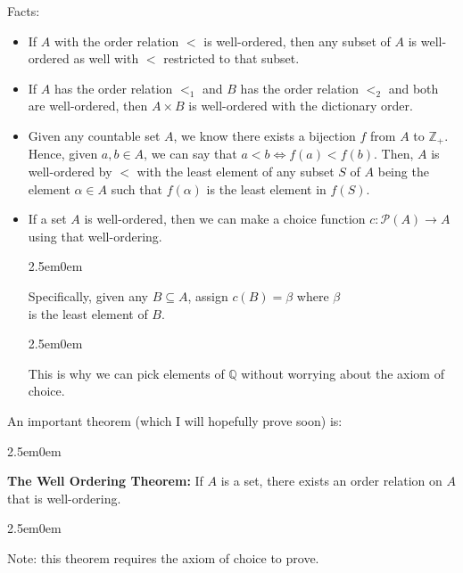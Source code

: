 \documentclass{book}
\newcommand{\myComment}{%
   \color{RawerSienna}%
   \fontsize{12}{14}\selectfont%
}
\newenvironment{myIndent}{%
   \begin{adjustwidth}{2.5em}{0em}%
}{%
   \end{adjustwidth}%
}
\newcommand{\blab}[1]{\textbf{#1}}
\newcommand{\retTwo}{\hfill\bigbreak}
\begin{document}
   Facts:
   \begin{itemize}
      \item If $A$ with the order relation $<$ is well-ordered, then any subset of $A$ is well-\\ordered as well with $<$ restricted to that subset.
      \item If $A$ has the order relation $<_1$ and $B$ has the order relation $<_2$ and both are well-ordered, then $A \times B$ is well-ordered with the dictionary order.
      \item Given any countable set $A$, we know there exists a bijection $f$ from $A$ to $\mathbb{Z}_+$. Hence, given $a, b \in A$, we can say that $a < b \Longleftrightarrow f(a) < f(b)$. Then, $A$ is well-ordered by $<$ with the least element of any subset $S$ of $A$ being the element $\alpha \in A$ such that $f(\alpha)$ is the least element in $f(S)$.
      \item If a set $A$ is well-ordered, then we can make a choice function $c: \mathcal{P}(A) \longrightarrow A$ using that well-ordering.
      
      \begin{myIndent}
         Specifically, given any $B \subseteq A$, assign $c(B) = \beta$ where $\beta$\\ is the least element of $B$.

         
         \begin{myIndent}\myComment
            This is why we can pick elements of $\mathbb{Q}$ without worrying about the axiom of choice.\retTwo\retTwo
         \end{myIndent}
      \end{myIndent}
   \end{itemize}

   An important theorem (which I will hopefully prove soon) is:
   
   \begin{myIndent}
      \blab{The Well Ordering Theorem:} If $A$ is a set, there exists an order relation on $A$ that is well-ordering.
      
      \begin{myIndent}\myComment
         Note: this theorem requires the axiom of choice to prove.\retTwo
      \end{myIndent}
   \end{myIndent}
\end{document}
